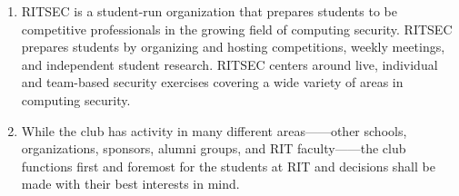

\begin{enumerate}
  \item RITSEC is a student-run organization that prepares students to be
    competitive professionals in the growing field of computing security. RITSEC prepares
    students by organizing and hosting competitions, weekly meetings,
    and independent student research. RITSEC centers around live,
    individual and team-based security exercises covering a wide variety of
    areas in computing security.
  \item While the club has activity in many different areas——other schools, 
    organizations, sponsors, alumni groups, and RIT
    faculty——the club functions first and foremost for the students at
    RIT and decisions shall be made with their
    best interests in mind.
\end{enumerate}
